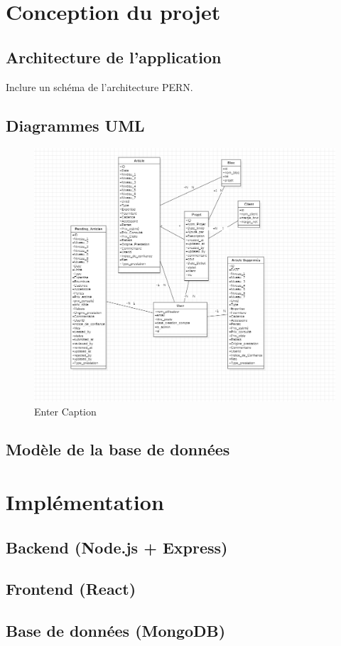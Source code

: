 \documentclass[12pt,a4paper]{report}
\begin{document}
\chapter{Conception du projet}
\section{Architecture de l’application}
Inclure un schéma de l’architecture PERN.  

\section{Diagrammes UML}

\begin{figure}[H]
    \centering
    \includegraphics[width=0.5\linewidth]{image.png}
    \caption{Enter Caption}
    \label{fig:placeholder}
\end{figure}

\section{Modèle de la base de données}

\chapter{Implémentation}
\section{Backend (Node.js + Express)}
\section{Frontend (React)}
\section{Base de données (MongoDB)}
\end{document}
